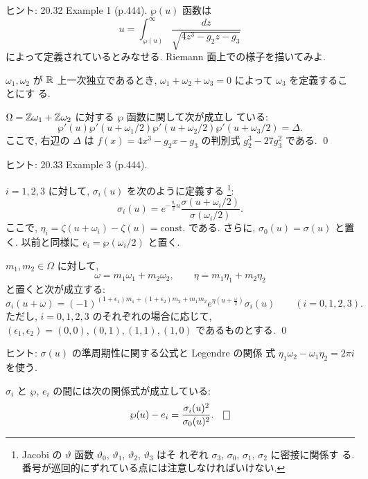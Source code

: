 \documentclass[12pt,twoside]{jarticle}
\def\pe{\wp}
\def\vt{\vartheta}
\def\Z{{\Bbb Z}} %
\def\R{{\Bbb R}} %
\begin{document}
\noindent ヒント: \cite{WW} 20.32 Example 1 (p.444). $\pe(u)$ 函数は
\[
  u = \int_{\pe(u)}^\infty \frac{dz}{\sqrt{4z^3-g_2z-g_3}}
\]
によって定義されているとみなせる. Riemann 面上での様子を描いてみよ.

\medskip $\omega_1,\omega_2$ が $\R$ 上一次独立であるとき,
$\omega_1+\omega_2+\omega_3=0$ によって $\omega_3$ を定義することにす
る. 

\begin{question}
  $\Omega=\Z\omega_1+\Z\omega_2$ に対する $\pe$ 函数に関して次が成立し
  ている:
  \[
    \pe'(u)\pe'(u+\omega_1/2)\pe'(u+\omega_2/2)\pe'(u+\omega_3/2)
    = \Delta.
  \]
  ここで, 右辺の $\Delta$ は $f(x)=4x^3-g_2x-g_3$ の判別式 %
  $g_2^3 -27g_3^2$ である. \qed
\end{question}

\noindent ヒント: \cite{WW} 20.33 Example 3 (p.444).

\bigskip

$i=1,2,3$ に対して, $\sigma_i(u)$ を次のように定義する%
\footnote{Jacobi の $\vt$ 函数 $\vt_0$, $\vt_1$, $\vt_2$, $\vt_3$ はそ
  れぞれ $\sigma_3$, $\sigma_0$, $\sigma_1$, $\sigma_2$ に密接に関係す
  る. 番号が巡回的にずれている点には注意しなければいけない.}:
\[
  \sigma_i(u)=
  e^{-\frac{\eta_i}{2}u} \frac{\sigma(u+\omega_i/2)}{\sigma(\omega_i/2)}.
\] %
ここで, $\eta_i=\zeta(u+\omega_i)-\zeta(u)=\text{const.}$ である. %
さらに, $\sigma_0(u)=\sigma(u)$ と置く. 以前と同様に %
$e_i=\pe(\omega_i/2)$ と置く.

\begin{question}
  $m_1,m_2\in\Omega$ に対して, %
  \[
    \omega = m_1 \omega_1 + m_2 \omega_2,
    \qquad
    \eta   = m_1 \eta_1   + m_2 \eta_2
  \] %
  と置くと次が成立する:
  \[
    \sigma_i(u+\omega) = 
    (-1)^{(1+\epsilon_1)m_1+(1+\epsilon_2)m_2+m_1m_2}
    e^{\eta \left( u + \frac{\omega}{2} \right)}
    \sigma_i(u)
    \qquad(i=0,1,2,3).
  \]
  ただし, $i=0,1,2,3$ のそれぞれの場合に応じて,
  $(\epsilon_1,\epsilon_2)=(0,0),(0,1),(1,1),(1,0)$ であるものとする.
  \qed
\end{question}

\noindent ヒント: $\sigma(u)$ の準周期性に関する公式と Legendre の関係
式 $\eta_1\omega_2 - \omega_1\eta_2=2\pi i$ を使う.

\begin{question}
  $\sigma_i$ と $\pe$, $e_i$ の間には次の関係式が成立している:
  \[
    \pe(u) - e_i = \frac{\sigma_i(u)^2}{\sigma_0(u)^2}.
    \qed
  \]
\end{question}
\end{document}
